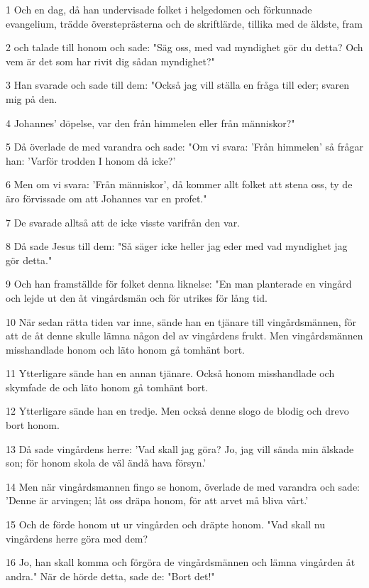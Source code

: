 \par 1 Och en dag, då han undervisade folket i helgedomen och förkunnade evangelium, trädde översteprästerna och de skriftlärde, tillika med de äldste, fram
\par 2 och talade till honom och sade: "Säg oss, med vad myndighet gör du detta? Och vem är det som har rivit dig sådan myndighet?"
\par 3 Han svarade och sade till dem: "Också jag vill ställa en fråga till eder; svaren mig på den.
\par 4 Johannes' döpelse, var den från himmelen eller från människor?"
\par 5 Då överlade de med varandra och sade: "Om vi svara: 'Från himmelen' så frågar han: 'Varför trodden I honom då icke?'
\par 6 Men om vi svara: 'Från människor', då kommer allt folket att stena oss, ty de äro förvissade om att Johannes var en profet."
\par 7 De svarade alltså att de icke visste varifrån den var.
\par 8 Då sade Jesus till dem: "Så säger icke heller jag eder med vad myndighet jag gör detta."
\par 9 Och han framställde för folket denna liknelse: "En man planterade en vingård och lejde ut den åt vingårdsmän och för utrikes för lång tid.
\par 10 När sedan rätta tiden var inne, sände han en tjänare till vingårdsmännen, för att de åt denne skulle lämna någon del av vingårdens frukt. Men vingårdsmännen misshandlade honom och läto honom gå tomhänt bort.
\par 11 Ytterligare sände han en annan tjänare. Också honom misshandlade och skymfade de och läto honom gå tomhänt bort.
\par 12 Ytterligare sände han en tredje. Men också denne slogo de blodig och drevo bort honom.
\par 13 Då sade vingårdens herre: 'Vad skall jag göra? Jo, jag vill sända min älskade son; för honom skola de väl ändå hava försyn.'
\par 14 Men när vingårdsmannen fingo se honom, överlade de med varandra och sade: 'Denne är arvingen; låt oss dräpa honom, för att arvet må bliva vårt.'
\par 15 Och de förde honom ut ur vingården och dräpte honom. "Vad skall nu vingårdens herre göra med dem?
\par 16 Jo, han skall komma och förgöra de vingårdsmännen och lämna vingården åt andra." När de hörde detta, sade de: "Bort det!"
